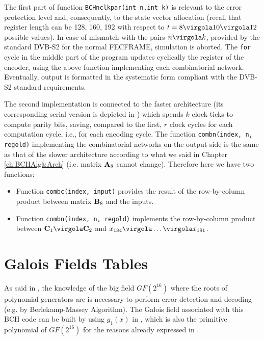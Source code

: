 

The first part of function \texttt{BCHnclkpar(int n,int k)} is relevant to the error protection level and, consequently, to the state vector allocation (recall that register length can be 128, 160, 192 with respect to \(t = 8 \virgola 10 \virgola 12\) possible values). In case of mismatch with the pairs \(n \virgola k\), provided by the standard DVB-S2 for the normal FECFRAME, simulation is aborted.
The \texttt{for} cycle in the middle part of the program updates cyclically the register of the encoder, using the above function implementing each combinatorial network. %
Eventually, output is formatted in the systematic form compliant with the DVB-S2 standard requirements.




The second implementation is connected to the faster architecture (its corresponding serial version is depicted in ) which spends \(k\) clock ticks to compute parity bits, saving, compared to the first, \(r\) clock cycles for each computation cycle, i.e., for each encoding cycle. The function \texttt{combn(index, n, regold)} implementing the combinatorial networks on the output side is the same as that of the slower architecture according to what we said in Chapter \ref{ch:BCHAlg&Arch} (i.e. matrix \(\mathbf{A}_8 \) cannot change).
Therefore here we have two functions:
\begin{itemize}
\item Function \texttt{combc(index, input)} provides the result of the row-by-column product between matrix \(\mathbf{B}_8\) and the inputs.
\item  Function \texttt{combn(index, n, regold)} implements the row-by-column product between \(\vet C_1 \virgola \vet C_2\) and \(x_{184}\virgola \ldots \virgola x_{191}\).
\end{itemize}





\section{Galois Fields Tables}

As said in , the knowledge of the big field \(GF(2^{16})\) where the roots of polynomial generators are is necessary to perform error detection and decoding (e.g. by Berlekamp-Massey Algorithm). The Galois field associated with this BCH code can be built by using \(g_1(x)\) in , which is also the primitive polynomial of \(GF(2^{16})\) for the reasons already expressed in .

